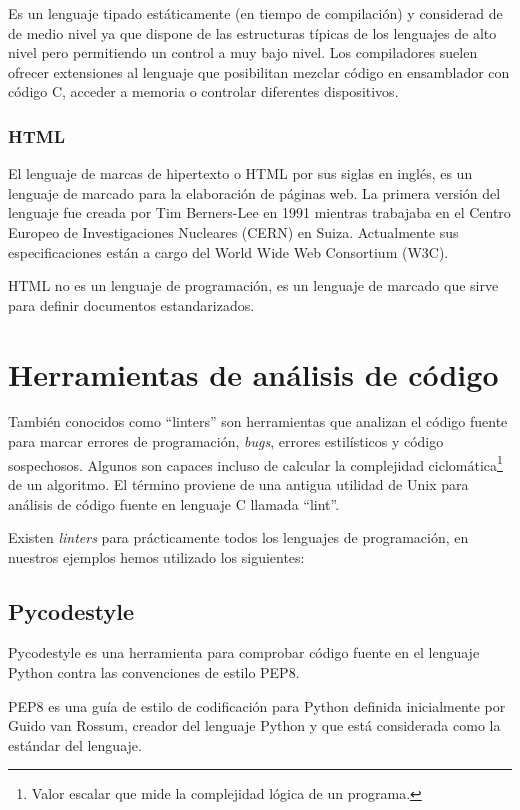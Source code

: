 \bigskip
Es un lenguaje tipado estáticamente (en tiempo de compilación) y considerad de de medio nivel ya que dispone de las estructuras típicas de los lenguajes de alto nivel pero permitiendo un control a muy bajo nivel. Los compiladores suelen ofrecer extensiones al lenguaje que posibilitan mezclar código en ensamblador con código C, acceder a memoria o controlar diferentes dispositivos.

\subsubsection{HTML}

El lenguaje de marcas de hipertexto o HTML por sus siglas en inglés, es un lenguaje de marcado para la elaboración de páginas web. La primera versión del lenguaje fue creada por Tim Berners-Lee en 1991 mientras trabajaba en el Centro Europeo de Investigaciones Nucleares (CERN) en Suiza. Actualmente sus especificaciones están a cargo del World Wide Web Consortium (W3C).

\bigskip
HTML no es un lenguaje de programación, es un lenguaje de marcado que sirve para definir documentos estandarizados.

\section {Herramientas de análisis de código}

También conocidos como ``linters''  son herramientas que analizan el código fuente para marcar errores de programación, \textit{bugs}, errores estilísticos y código sospechosos. Algunos son capaces incluso de calcular la complejidad ciclomática\footnote{Valor escalar que mide la complejidad lógica de un programa.} de un algoritmo. El término proviene de una antigua utilidad de Unix para análisis de código fuente en lenguaje C llamada ``lint''.

\bigskip
Existen \textit{linters} para prácticamente todos los lenguajes de programación, en nuestros ejemplos hemos utilizado los siguientes:

\subsection {Pycodestyle}

Pycodestyle es una herramienta para comprobar código fuente en el lenguaje Python contra las convenciones de estilo PEP8.

\bigskip
PEP8 es una guía de estilo de codificación para Python definida inicialmente por Guido van Rossum, creador del lenguaje Python y que está considerada como la estándar del lenguaje.

